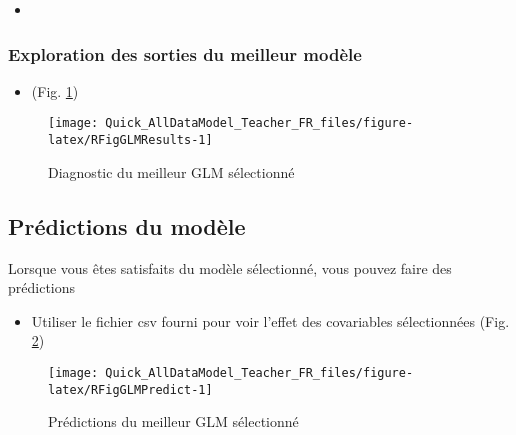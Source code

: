\documentclass[french,a4paper]{article}
\providecommand{\tightlist}{%
  \setlength{\itemsep}{0pt}\setlength{\parskip}{0pt}}
\begin{document}
\begin{itemize}
\item
\end{itemize}

\hypertarget{exploration-des-sorties-du-meilleur-modele}{%
\subsubsection{Exploration des sorties du meilleur
modèle}\label{exploration-des-sorties-du-meilleur-modele}}

\begin{itemize}
\tightlist
\item
  (Fig. \ref{fig:RFigGLMResults})
\end{itemize}



\begin{figure}[!h]

{\centering \texttt{[image: Quick\_AllDataModel\_Teacher\_FR\_files/figure-latex/RFigGLMResults-1]} 

}

\caption{Diagnostic du meilleur GLM sélectionné}\label{fig:RFigGLMResults}
\end{figure}

\hypertarget{predictions-du-modele}{%
\subsection{Prédictions du modèle}\label{predictions-du-modele}}

Lorsque vous êtes satisfaits du modèle sélectionné, vous pouvez faire
des prédictions

\begin{itemize}
\tightlist
\item
  Utiliser le fichier csv fourni pour voir l'effet des covariables
  sélectionnées (Fig. \ref{fig:RFigGLMPredict})
\end{itemize}



\begin{figure}[!h]

{\centering \texttt{[image: Quick\_AllDataModel\_Teacher\_FR\_files/figure-latex/RFigGLMPredict-1]} 

}

\caption{Prédictions du meilleur GLM sélectionné}\label{fig:RFigGLMPredict}
\end{figure}
\end{document}
